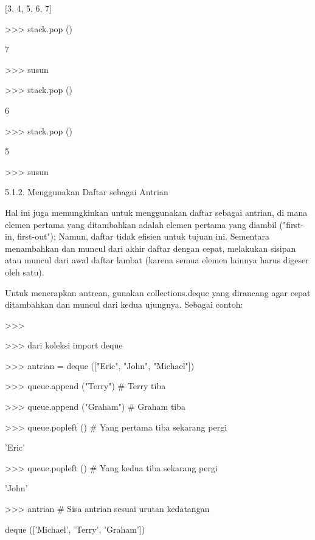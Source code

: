 [3, 4, 5, 6, 7] \par
>>> stack.pop () \par
7 \par
>>> susun \par
[3, 4, 5, 6] \par
>>> stack.pop () \par
6 \par
>>> stack.pop () \par
5 \par
>>> susun \par
[3, 4] \par
\vspace{12pt}
5.1.2. Menggunakan Daftar sebagai Antrian \par
\vspace{12pt}
Hal ini juga memungkinkan untuk menggunakan daftar sebagai antrian, di mana elemen pertama yang ditambahkan adalah elemen pertama yang diambil ("first-in, first-out"); Namun, daftar tidak efisien untuk tujuan ini. Sementara menambahkan dan muncul dari akhir daftar dengan cepat, melakukan sisipan atau muncul dari awal daftar lambat (karena semua elemen lainnya harus digeser oleh satu). \par
\vspace{12pt}
Untuk menerapkan antrean, gunakan collections.deque yang dirancang agar cepat ditambahkan dan muncul dari kedua ujungnya. Sebagai contoh: \par
>>> \par
\vspace{12pt}
>>> dari koleksi import deque \par
>>> antrian = deque (["Eric", "John", "Michael"]) \par
>>> queue.append ("Terry")  $  \#  $ Terry tiba \par
>>> queue.append ("Graham")  $  \#  $ Graham tiba \par
>>> queue.popleft ()  $  \#  $ Yang pertama tiba sekarang pergi \par
'Eric' \par
>>> queue.popleft ()  $  \#  $ Yang kedua tiba sekarang pergi \par
'John' \par
>>> antrian  $  \#  $ Sisa antrian sesuai urutan kedatangan \par
deque (['Michael', 'Terry', 'Graham']) \par
\vspace{12pt}
